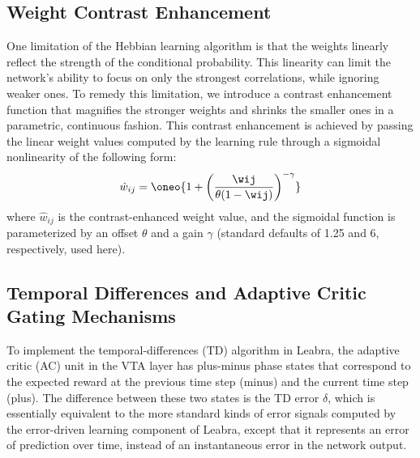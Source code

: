 \subsection{Weight Contrast Enhancement} 

One limitation of the Hebbian learning algorithm is that the weights linearly reflect the strength of the conditional probability.  This linearity can limit the network's ability to focus on only the strongest correlations, while ignoring weaker ones.  To remedy this limitation, we introduce a contrast enhancement function that magnifies the stronger weights and shrinks the smaller ones in a parametric, continuous fashion.  This contrast enhancement is achieved by passing the linear weight values computed by the learning rule
through a sigmoidal nonlinearity of the following form:
\begin{equation}
  \hat{w}_{ij} = \oneo{1 + \left(\frac{\wij}{\theta (1-\wij)}\right)^{-\gamma}}
  \label{eq.wt_off}
\end{equation}
where $\hat{w}_{ij}$ is the contrast-enhanced weight value, and the sigmoidal function is parameterized by an offset $\theta$ and a gain $\gamma$ (standard defaults of 1.25 and 6, respectively, used here).  


\subsection{Temporal Differences and Adaptive Critic Gating Mechanisms} 

To implement the temporal-differences (TD) algorithm in Leabra, the adaptive critic (AC) unit in the VTA layer has plus-minus phase states that correspond to the expected reward at the previous time step (minus) and the current time step (plus).  The difference between these two states is the TD error $\delta$, which is essentially equivalent to the more standard kinds of error signals computed by the error-driven learning component of Leabra, except that it represents an error of prediction over time, instead of an instantaneous error in the network output.

